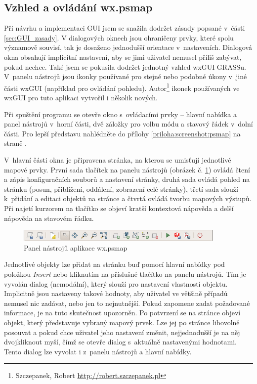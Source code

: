 \documentclass[a4paper,12pt,draft]{article}
\begin{document}
\subsection{Vzhled a ovládání wx.psmap}

Při návrhu a implementaci GUI jsem se snažila dodržet
zásady popsané v~části \ref{sec:GUI_zasady}.
V dialogových oknech jsou ohraničeny prvky, které spolu význa\-mově souvisí,
tak je dosaženo jednodušší orientace v~nastaveních. Dialogová okna obsahují
 implicitní nastavení, aby se jimi uživatel nemusel příliš zabývat, pokud
nechce.
Také jsem se pokusila dodržet jednotný vzhled wxGUI GRASSu. V~panelu nástrojů
jsou ikonky používané pro stejné nebo podobné úkony v~jiné části wxGUI
(například pro ovládání pohledu).
Autor\footnote{%
Szczepanek, Robert \url{http://robert.szczepanek.pl}} ikonek používaných ve
wxGUI pro tuto aplikaci vytvořil i několik nových.



Při spuštění programu se otevře okno s~ovládacími prvky -- hlavní
nabídka a panel nástrojů v~horní části, dvě záložky pro volbu módu
a stavový řádek v~dolní části. Pro lepší představu nahlédněte do přílohy
\ref{priloha:screenshot:psmap} na straně \pageref{priloha:screenshot:psmap}.



V~hlavní části okna je připravena stránka, na kterou se umisťují
jednotlivé mapové prvky. První sada tlačítek na panelu nástrojů
(obrázek č. \ref{fig:psmap_toolbar})
ovládá čtení a zápis konfiguračních souborů a nastavení stránky, druhá sada
ovládá pohled na stránku (posun, přiblížení, oddálení, zobrazení
celé stránky), třetí sada slouží k~při\-dání a editaci objektů na
stránce a čtvrtá ovládá tvorbu mapových výstupů. Při
najetí kurzorem na tlačítko se objeví kratší kontextová nápověda
a delší nápověda na stavovém řádku.
\begin{figure}[h!]
  \centering
  \includegraphics[width=0.9\textwidth]{./GUI_screenshots/psmap_toolbar.png}
  \caption{Panel nástrojů aplikace wx.psmap}
  \label{fig:psmap_toolbar}
\end{figure}

Jednotlivé objekty lze přidat na stránku buď pomocí hlavní nabídky
pod polož\-kou \emph{Insert} nebo kliknutím na příslušné tlačítko na
panelu nástrojů. Tím je vyvolán dialog (nemodální), který slouží
pro nastavení vlastností objektu. Implicitně jsou nastaveny takové
hodnoty, aby uživatel ve většině případů nemusel nic zadávat, nebo
jen to nejnutnější. Pokud zapomene zadat požadované informace, je na
tuto skutečnost upozorněn. Po potvrzení se na stránce objeví objekt,
který představuje vybraný mapový prvek. Lze jej po stránce libovolně
posouvat a pokud chce uživatel jeho nastavení změnit, nejjednodušší je
na něj dvojkliknout myší, čímž se otevře dialog s~aktuálně nastavenými
hodnotami. Tento dialog lze vyvolat i z~panelu nástrojů a hlavní nabídky.
\end{document}
